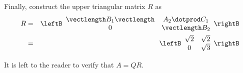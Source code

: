 \begin{solution}
Finally, construct the upper triangular matrix $R$ as 
\begin{eqnarray*}
R &=& 
\leftB
\begin{array}{cc}
\vectlength B_1 \vectlength & A_2 \dotprod C_1  \\
0 & \vectlength B_2 
\end{array}
\rightB \\
&=& 
\leftB
\begin{array}{cc}
\sqrt{2} & \sqrt{2} \\
0 & \sqrt{3} \\
\end{array}
\rightB
\end{eqnarray*}

It is left to the reader to verify that $A=QR$. 
\end{solution}